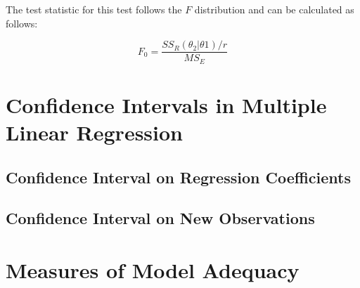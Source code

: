 \documentclass[a4paper]{article}
\theoremstyle{plain}
\begin{document}
The test statistic for this test follows the $F$ distribution and can be calculated as follows: 

$$F_0 = 
\frac{
SS_R(\theta_2|\theta1)/r
}
{MS_E
} $$


\pagebreak

\section{Confidence Intervals in Multiple Linear Regression}
\subsection{Confidence Interval on Regression Coefficients}

\subsection{Confidence Interval on New Observations}

\pagebreak
\section{Measures of Model Adequacy}




\pagebreak


\end{document}
